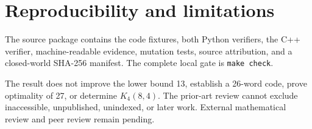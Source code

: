\documentclass[11pt]{article}
\begin{document}
\section{Reproducibility and limitations}

The source package contains the code fixtures, both Python verifiers, the
C++ verifier, machine-readable evidence, mutation tests, source attribution,
and a closed-world SHA-256 manifest. The complete local gate is
\texttt{make check}.

The result does not improve the lower bound 13, establish a 26-word code,
prove optimality of 27, or determine $K_4(8,4)$. The prior-art review cannot
exclude inaccessible, unpublished, unindexed, or later work. External
mathematical review and peer review remain pending.
\end{document}
